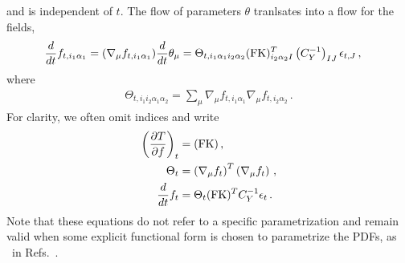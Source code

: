 \documentclass[11pt]{article}
\begin{document}
and is independent of $t$. The flow of parameters $\theta$ tranlsates into a flow for the fields, 
\begin{align}
    \label{eq:NTKFlow}
    \frac{d}{dt} &f_{t,i_1\alpha_1} = (\nabla_\mu f_{t,i_1\alpha_1}) \frac{d}{dt} \theta_\mu = 
      \Theta_{t,i_1\alpha_1i_2\alpha_2} 
      (\mathrm{FK})^T_{i_2\alpha_2I} \left(C_Y^{-1}\right)_{IJ} \epsilon_{t,J}\, ,    
\end{align}
where
\begin{align}
    \label{eq:NTKDef}
    \Theta_{t,i_1i_2\alpha_1\alpha_2} = \sum_\mu 
    \nabla_\mu f_{t,i_1\alpha_1} \nabla_\mu f_{t,i_2\alpha_2}\, .
\end{align}
For clarity, we often omit indices and write
\begin{align}
    \left(\frac{\partial T}{\partial f}\right)_t 
        &= (\mathrm{FK})\, , \\
    \Theta_t  
        &= \left(\nabla_\mu f_t\right)^T \left(\nabla_\mu f_t\right)\, , \\
    \frac{d}{dt} f_t 
        &= \Theta_t (\mathrm{FK})^T C_Y^{-1} \epsilon_t\, .
\end{align}
Note that these equations do not refer to a specific parametrization and remain valid when some 
explicit functional form is chosen to parametrize the PDFs, as \eg\ in 
Refs.~\cite{Bailey:2020ooq,Hou:2019efy}.






\end{document}
